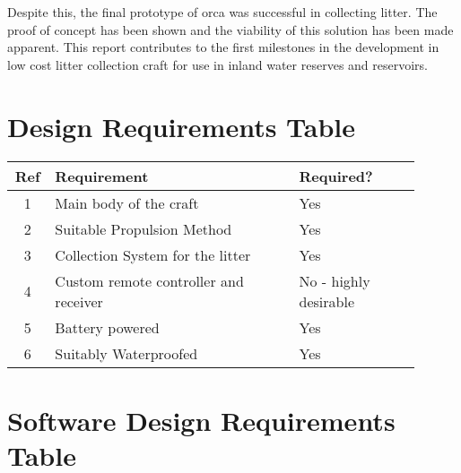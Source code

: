 \documentclass [12pt]{article}
\begin{document}
Despite this, the final prototype of \gls{orca} was successful in collecting litter. The proof of concept has been shown and the viability of this solution has been made apparent. This report contributes to the first milestones in the development in low cost litter collection craft for use in inland water reserves and reservoirs. 

\newpage




\newpage
\appendix

\section{Design Requirements Table}\label{app:design_requirements_hardware}

\begin{table}[H]
\begin{tabular}{||c||p{0.6\linewidth}|p{0.3\linewidth}||}
\hline
Ref & Requirement                           & Required?             \\
\hline
1   & Main body of the craft                & Yes                   \\
\hline
2   & Suitable Propulsion Method            & Yes                   \\
\hline
3   & Collection System for the litter      & Yes                   \\
\hline
4   & Custom remote controller and receiver & No - highly desirable \\
\hline
5   & Battery powered                       & Yes                   \\
\hline
6   & Suitably Waterproofed                 & Yes\\
\hline              
\end{tabular}
\end{table}

\section{Software Design Requirements Table}\label{app:design_requirements_software}
\end{document}
